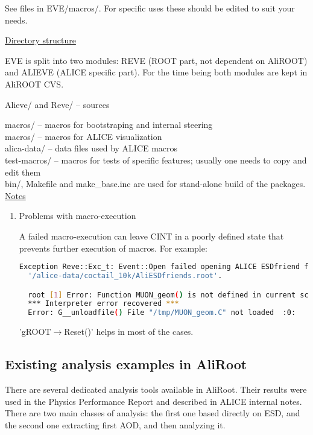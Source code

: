 \documentclass[12pt,a4paper,twoside]{article}
\makeatletter
\newcommand {\aliroot} {AliRoot\@\xspace}
\makeatother
\begin{document}
{See files in EVE/macros/. For specific uses these should be
edited to suit your needs.

\underline{Directory structure}

EVE is split into two modules: REVE (ROOT part, not dependent on
AliROOT) and ALIEVE (ALICE specific part). For the time being both
modules are kept in AliROOT CVS.

Alieve/ and Reve/ -- sources

macros/		  -- macros for bootstraping and internal steering\\
macros/	  -- macros for ALICE visualization\\
alica-data/	  -- data files used by ALICE macros\\
test-macros/      -- macros for tests of specific features; usually one needs
                     to copy and edit them\\
bin/, Makefile and make\_base.inc are used for stand-alone build of the
packages.\\

\underline{Notes}

\begin{enumerate}
\item Problems with macro-execution

A failed macro-execution can leave CINT in a poorly defined state that
prevents further execution of macros. For example:

\begin{lstlisting}[language=sh]
  Exception Reve::Exc_t: Event::Open failed opening ALICE ESDfriend from
  '/alice-data/coctail_10k/AliESDfriends.root'.

  root [1] Error: Function MUON_geom() is not defined in current scope  :0:
  *** Interpreter error recovered ***
  Error: G__unloadfile() File "/tmp/MUON_geom.C" not loaded  :0:
\end{lstlisting}

'gROOT$\to$Reset()' helps in most of the cases.
\end{enumerate}


\vspace{-0.2cm}
\subsection{Existing analysis examples in \aliroot}

There are several dedicated analysis tools available in \aliroot. Their results
were used in the Physics Performance Report and described in
ALICE internal notes. There are two main classes of analysis: the
first one based directly on ESD, and the second one extracting first
AOD, and then analyzing it.

}
\end{document}
